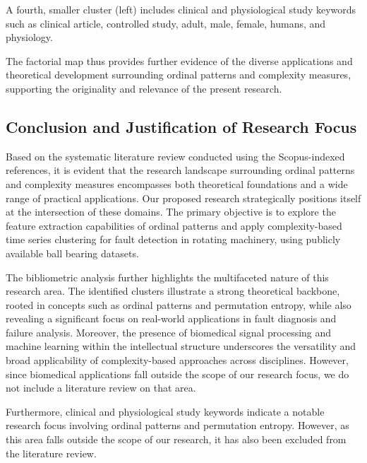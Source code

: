 A fourth, smaller cluster (left) includes clinical and physiological study keywords such as clinical article, controlled study, adult, male, female, humans, and physiology.

The factorial map thus provides further evidence of the diverse applications and theoretical development surrounding ordinal patterns and complexity measures, supporting the originality and relevance of the present research.

\subsection{Conclusion and Justification of Research Focus}

Based on the systematic literature review conducted using the Scopus-indexed references, it is evident that the research landscape surrounding ordinal patterns and complexity measures encompasses both theoretical foundations and a wide range of practical applications. Our proposed research strategically positions itself at the intersection of these domains. 
The primary objective is to explore the feature extraction capabilities of ordinal patterns and apply complexity-based time series clustering for fault detection in rotating machinery, using publicly available ball bearing datasets.

The bibliometric analysis further highlights the multifaceted nature of this research area. 
The identified clusters illustrate a strong theoretical backbone, rooted in concepts such as ordinal patterns and permutation entropy, while also revealing a significant focus on real-world applications in fault diagnosis and failure analysis. 
Moreover, the presence of biomedical signal processing and machine learning within the intellectual structure underscores the versatility and broad applicability of complexity-based approaches across disciplines. 
However, since biomedical applications fall outside the scope of our research focus, we do not include a literature review on that area.

Furthermore, clinical and physiological study keywords indicate a notable research focus involving ordinal patterns and permutation entropy. However, as this area falls outside the scope of our research, it has also been excluded from the literature review.


